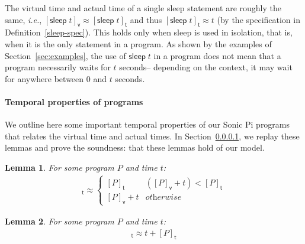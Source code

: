 \documentclass[preprint]{sigplanconf}
\renewcommand{\geq}{\geqslant}
\newcommand{\note}[1]{{\color{blue}{#1}}}
\newtheorem{lemma}{Lemma}
\theoremstyle{definition}
\newcommand{\sleep}{\mathsf{sleep}\;}
\newcommand{\sleepOp}{\textsf{sleep}}
\newcommand{\ksleepOp}{\textsf{kernelSleep}}
\newcommand{\lang}{Sonic Pi}
\newcommand{\vtime}[1]{[#1]_{\mathsf{v}}}
\newcommand{\etime}[1]{[#1]_{\mathsf{t}}}
\newcommand{\ie}{\emph{i.e.}}
\begin{document}
\note{Discuss this further, may be
  able to say later that in some cases $\epsilon$ is the scheduling
  time for play statments?}


The virtual time and actual time of a single sleep statement
 are roughly the same, \ie{}, $\vtime{\sleep t} \approx
\etime{\sleep t}$ and thus $\etime{\sleep t} \approx t$ (by the
specification in Definition~\ref{sleep-spec}). This holds
only when \sleepOp{} is used in isolation, that is, when it is the
only statement in a program. As shown by the examples of
Section~\ref{sec:examples}, the use of $\sleep t$ in a program does
not mean that a program necessarily waits for $t$ seconds-- depending
on the context, it may wait for anywhere between $0$ and $t$ seconds.

\paragraph{Temporal properties of programs}

We outline here some important temporal properties of our \lang{} programs
that relates the virtual time and actual times. In Section~\ref{}, we
replay these lemmas and prove the soundness: that these lemmas hold of our model.


\begin{lemma}
For some program $P$ and time $t$:
\begin{align*}
\etime{P; \sleep{} t} \approx
 \begin{cases}
   \etime{P} & (\vtime{P} + t) < \etime{P} \\
   \vtime{P} + t  & \textit{otherwise}
 \end{cases}
\end{align*}
\label{lem:sleep-R}
\end{lemma}

\begin{lemma}
For some program $P$ and time $t$:
\begin{align*}
\etime{\sleep{} t; P} \approx t + \etime{P}
\end{align*}
\label{lem:sleep-L}
\end{lemma}
\end{document}
